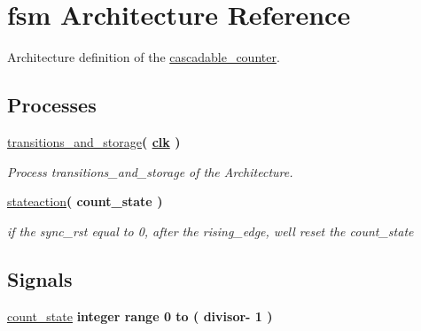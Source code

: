 \hypertarget{classcascadable__counter_1_1fsm}{}\section{fsm Architecture Reference}
\label{classcascadable__counter_1_1fsm}


Architecture definition of the \hyperlink{classcascadable__counter}{cascadable\+\_\+counter}.  


\subsection*{Processes}
 \begin{DoxyCompactItemize}
\item 
\hyperlink{classcascadable__counter_1_1fsm_aca869937c40a3cb0b3e8467b28f4c42b}{transitions\+\_\+and\+\_\+storage}{\bfseries  ( {\bfseries {\bfseries \hyperlink{classcascadable__counter_a6231b307b7958b6060563aa2a93d345a}{clk}} \textcolor{vhdlchar}{ }} )}
\begin{DoxyCompactList}\small\item\em Process transitions\+\_\+and\+\_\+storage of the Architecture. \end{DoxyCompactList}\item 
\hyperlink{classcascadable__counter_1_1fsm_a1d677b6bb6166ce57abc767d771832b1}{stateaction}{\bfseries  ( {\bfseries \textcolor{vhdlchar}{count\+\_\+state}\textcolor{vhdlchar}{ }} )}\hypertarget{classcascadable__counter_1_1fsm_a1d677b6bb6166ce57abc767d771832b1}{}\label{classcascadable__counter_1_1fsm_a1d677b6bb6166ce57abc767d771832b1}

\begin{DoxyCompactList}\small\item\em if the sync\+\_\+rst equal to \textquotesingle{}0\textquotesingle{}, after the rising\+\_\+edge, we\textquotesingle{}ll reset the count\+\_\+state \end{DoxyCompactList}\end{DoxyCompactItemize}
\subsection*{Signals}
 \begin{DoxyCompactItemize}
\item 
\hyperlink{classcascadable__counter_1_1fsm_a17cbd5b34591bc118d423ba7b7a733aa}{count\+\_\+state} {\bfseries \textcolor{vhdlchar}{integer}\textcolor{vhdlchar}{ }\textcolor{vhdlchar}{ }\textcolor{vhdlchar}{ }\textcolor{vhdlchar}{range}\textcolor{vhdlchar}{ }\textcolor{vhdlchar}{ } \textcolor{vhdldigit}{0} \textcolor{vhdlchar}{ }\textcolor{vhdlchar}{to}\textcolor{vhdlchar}{ }\textcolor{vhdlchar}{(}\textcolor{vhdlchar}{ }\textcolor{vhdlchar}{ }\textcolor{vhdlchar}{ }\textcolor{vhdlchar}{ }\textcolor{vhdlchar}{divisor}\textcolor{vhdlchar}{-\/}\textcolor{vhdlchar}{ } \textcolor{vhdldigit}{1} \textcolor{vhdlchar}{ }\textcolor{vhdlchar}{)}\textcolor{vhdlchar}{ }} \hypertarget{classcascadable__counter_1_1fsm_a17cbd5b34591bc118d423ba7b7a733aa}{}\label{classcascadable__counter_1_1fsm_a17cbd5b34591bc118d423ba7b7a733aa}

\end{DoxyCompactItemize}


